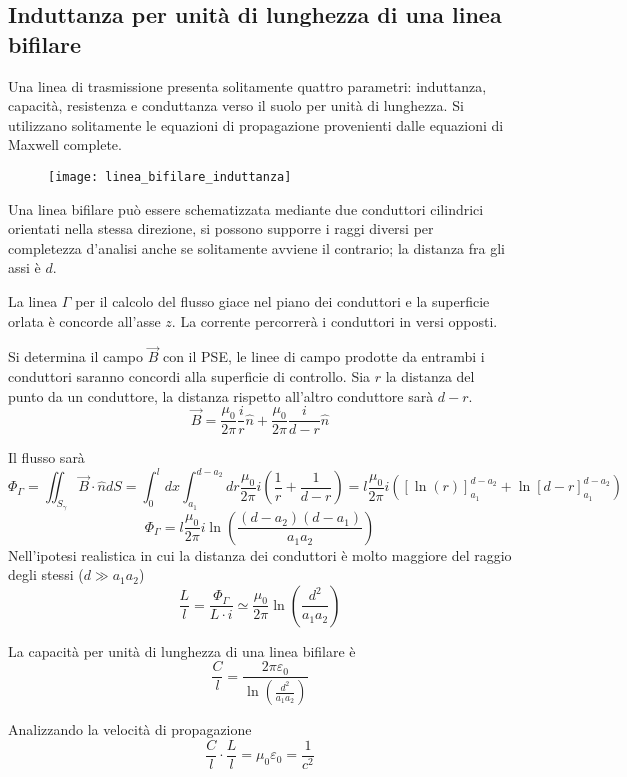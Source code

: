 
\subsection{Induttanza per unità di lunghezza di una linea bifilare}
Una linea di trasmissione presenta solitamente quattro parametri: induttanza, capacità, 
resistenza e conduttanza verso il suolo per unità di lunghezza.
Si utilizzano solitamente le equazioni di propagazione provenienti dalle equazioni di Maxwell
complete.

\begin{figure}[H]
\centering
\texttt{[image: linea\_bifilare\_induttanza]}
\end{figure}

Una linea bifilare può essere schematizzata mediante due conduttori cilindrici orientati 
nella stessa direzione, si possono supporre i raggi diversi  per completezza d'analisi
anche se solitamente avviene il contrario; la distanza fra gli assi è $d$.

La linea $\Gamma$ per il calcolo del flusso giace nel piano dei conduttori e la superficie
orlata è concorde all'asse $z$. La corrente percorrerà i conduttori in versi opposti.

Si determina il campo $\vec{B}$ con il PSE, le linee di campo prodotte da entrambi i 
conduttori saranno concordi alla superficie di controllo.
Sia $r$ la distanza del punto da un conduttore, la distanza rispetto all'altro conduttore
sarà $d-r$.
$$
\vec{B} = \frac{\mu_0}{2\pi } \frac{i}{r} \hat{n} + \frac{\mu_0}{2 \pi} \frac{i}{d-r} \hat{n}
$$

Il flusso sarà
$$
\Phi_\Gamma = \iint_{S_\gamma} \vec{B}\cdot\hat{n}dS = \int_0^l dx \int_{a_1}^{d-a_2} dr 
\frac{\mu_0}{2\pi} i \left( \frac{1}{r} + \frac{1}{d-r} \right) = l \frac{\mu_0}{2\pi}i \left( \left[\ln\left(r\right)\right]_{a_1}^{d-a_2}  + \ln\left[d-r\right]_{a_1}^{d-a_2} \right)
$$
$$
\Phi_\Gamma = l\frac{\mu_0}{2\pi} i \ln\left(\frac{(d-a_2)(d-a_1)}{a_1a_2}\right)
$$
Nell'ipotesi realistica in cui la distanza dei conduttori è molto maggiore del raggio degli 
stessi ($d\gg a_1a_2$)
$$
\frac{L}{l} = \frac{\Phi_\Gamma}{L\cdot i} \simeq \frac{\mu_0}{2\pi} \ln\left(\frac{d^2}{a_1a_2}\right)
$$

La capacità per unità di lunghezza di una linea bifilare è
$$
\frac{C}{l} = \frac{2\pi \varepsilon_0}{\ln\left(\frac{d^2}{a_1a_2}\right)}
$$

Analizzando la velocità di propagazione
$$
\frac{C}{l}\cdot\frac{L}{l} = \mu_0\varepsilon_0 = \frac{1}{c^2}
$$

